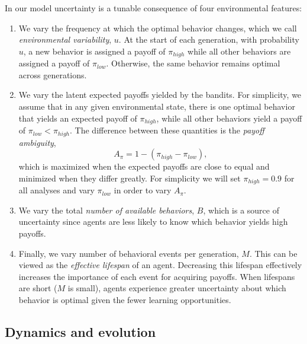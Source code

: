 \documentclass[letterpaper,11.5pt]{scrartcl}
\begin{document}
In our model uncertainty is a tunable consequence of four environmental features:
\begin{enumerate}
    \item We vary the frequency at which the optimal behavior changes, which we call \emph{environmental variability}, $u$. At the start of each generation, with probability $u$, a new behavior is assigned a payoff of $\pi_{high}$ while all other behaviors are assigned a payoff of $\pi_{low}$. Otherwise, the same behavior remains optimal across generations. 
    \item We vary the latent expected payoffs yielded by the bandits. For simplicity,
      we assume that in any given environmental state, there is one optimal behavior that
      yields an expected payoff of $\pi_{high}$, while all other behaviors yield a 
      payoff of $\pi_{low} < \pi_{high}$. 
      The difference between these quantities is the \emph{payoff ambiguity}, 
    \begin{equation}
      A_\pi = 1 - (\pi_{high} - \pi_{low}),
      \label{eq:payoffAmbiguity}
    \end{equation}
    which is maximized when the expected payoffs are close to equal and minimized
    when they differ greatly. For simplicity we will set $\pi_{high} = 0.9$
    for all analyses and vary $\pi_{low}$ in order to vary $A_\pi$.
    \item We vary the total \emph{number of available behaviors}, $B$, which is a
      source of uncertainty since agents are less likely to know which behavior yields high payoffs.  %
    \item Finally, we vary number of behavioral events per generation, $M$. This can be viewed as the \emph{effective lifespan} of an agent.  Decreasing this lifespan effectively increases the importance of each event for acquiring payoffs. When lifespans are short ($M$ is small), agents experience greater uncertainty about which behavior is optimal given the fewer learning opportunities.
\end{enumerate}


\subsection{Dynamics and evolution}
\end{document}

